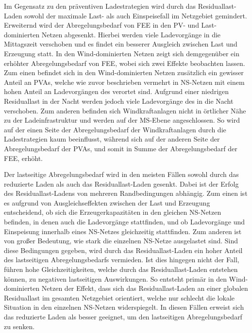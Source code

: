 Im Gegensatz zu den präventiven Ladestrategien wird durch das Residuallast-Laden sowohl der maximale Last- als auch Einspeisefall im Netzgebiet gemindert.
Erweiternd wird der Abregelungsbedarf von \gls{FEE} in den \gls{PV}- und Last-dominierten Netzen abgesenkt.
Hierbei werden viele Ladevorgänge in die Mittagszeit verschoben und es findet ein besserer Ausgleich zwischen Last und Erzeugung statt.
In den Wind-dominierten Netzen zeigt sich demgegenüber ein erhöhter Abregelungsbedarf von \gls{FEE}, wobei sich zwei Effekte beobachten lassen.
Zum einen befindet sich in den Wind-dominierten Netzen zusätzlich ein gewisser Anteil an \glspl{PVA}, welche wie zuvor beschrieben vermehrt in \gls{NS}-Netzen mit einem hohen Anteil an Ladevorgängen des \UC \zH verortet sind.
Aufgrund einer niedrigen Residuallast in der Nacht werden jedoch viele Ladevorgänge des \UC \zH in die Nacht verschoben.
Zum anderen befinden sich Windkraftanlagen nicht in örtlicher Nähe zu der Ladeinfrastruktur und werden auf der \gls{MS}-Ebene angeschlossen.
So wird auf der einen Seite der Abregelungsbedarf der Windkraftanlagen durch die Ladestrategien kaum beeinflusst, während sich auf der anderen Seite der Abregelungsbedarf der \glspl{PVA}, und somit in Summe der Abregelungsbedarf der \gls{FEE}, erhöht.\medskip

Der lastseitige Abregelungsbedarf wird in den meisten Fällen sowohl durch das reduzierte Laden als auch das Residuallast-Laden gesenkt.
Dabei ist der Erfolg des Residuallast-Ladens von mehreren Randbedingungen abhängig.
Zum einen ist es aufgrund von Ausgleichseffekten zwischen der Last und Erzeugung entscheidend, ob sich die Erzeugerkapazitäten in den gleichen \gls{NS}-Netzen befinden, in denen auch die Ladevorgänge stattfinden, und ob Ladevorgänge und Einspeisung innerhalb eines \gls{NS}-Netzes gleichzeitig stattfinden.
Zum anderen ist von großer Bedeutung, wie stark die einzelnen \gls{NS}-Netze ausgelastet sind.
Sind diese Bedingungen gegeben, wird durch das Residuallast-Laden ein hoher Anteil des lastseitigen Abregelungsbedarfs vermieden.
Ist dies hingegen nicht der Fall, führen hohe Gleichzeitigkeiten, welche durch das Residuallast-Laden entstehen können, zu negativen lastseitigen Auswirkungen.
So entsteht primär in den Wind-dominierten Netzen der Effekt, dass sich das Residuallast-Laden an einer globalen Residuallast im gesamten Netzgebiet orientiert, welche nur schlecht die lokale Situation in den einzelnen \gls{NS}-Netzen widerspiegelt.
In diesen Fällen erweist sich das reduzierte Laden als besser geeignet, um den lastseitigen Abregelungsbedarf zu senken.

